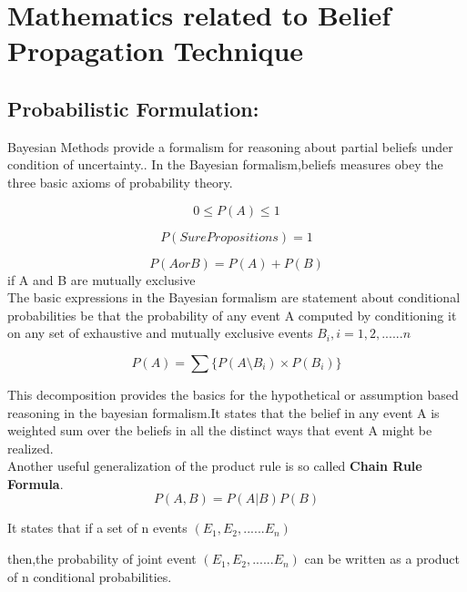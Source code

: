 \chapter{\textbf{Mathematics related to Belief Propagation Technique}}

\section{Probabilistic Formulation:}

Bayesian Methods provide a formalism for reasoning about partial beliefs under condition of uncertainty..
In the Bayesian formalism,beliefs measures obey the three basic axioms of probability theory.


\begin{equation}
   0 \leq P(A) \leq 1
\end{equation}

\begin{equation}
    P(Sure Propositions)=1
\end{equation}

\begin{equation}
  P (A    or  B) = P(A)+ P(B)
\end{equation}
 if A and B are mutually exclusive
\\The basic expressions in the Bayesian formalism are statement about conditional probabilities be that
the probability of any event A computed by conditioning it on any set of exhaustive and mutually exclusive events $B_i,i=1,2,......n$



\begin{equation}
     P(A)= \sum \{P(A\setminus B_i)\times P(B_i)\}
\end{equation}


This decomposition provides the basics for the hypothetical or assumption based reasoning in the bayesian formalism.It states that the belief in any event A is weighted sum over the beliefs in all the distinct  ways that event A might be realized.
\\ Another useful generalization of the product rule is so called \textbf{Chain Rule Formula}.
\begin{equation}
P(A,B)=P(A|B)P(B)
\end{equation}

It states that if  a set of n events $(E{_1},E{_2},......E{_n})$


then,the probability of joint event $(E_1,E{_2},......E{_n})$ can be written as a product of n conditional probabilities.


